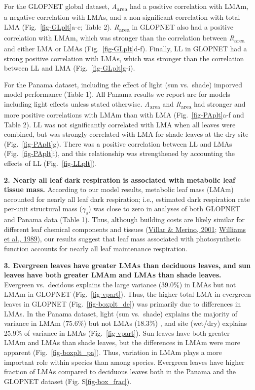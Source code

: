 \documentclass[
  12pt,
  a4paper,
,tablecaptionabove
]{scrartcl}
\begin{document}
For the GLOPNET global dataset, \emph{A}\textsubscript{area} had a
positive correlation with LMAm, a negative correlation with LMAs, and a
non-significant correlation with total LMA (Fig.~\ref{fig-GLplt}a-c;
Table 2). \emph{R}\textsubscript{area} in GLOPNET also had a positive
correlation with LMAm, which was stronger than the correlation between
\emph{R}\textsubscript{area} and either LMA or LMAs
(Fig.~\ref{fig-GLplt}d-f). Finally, LL in GLOPNET had a strong positive
correlation with LMAs, which was stronger than the correlation between
LL and LMA (Fig.~\ref{fig-GLplt}g-i).

For the Panama dataset, including the effect of light (sun vs.~shade)
imporved model performance (Table 1). All Panama results we report are
for models including light effects unless stated otherwise.
\emph{A}\textsubscript{area} and \emph{R}\textsubscript{area} had
stronger and more positive correlations with LMAm than with LMA
(Fig.~\ref{fig-PAplt}a-f and Table 2). LL was not significantly
correlated with LMA when all leaves were combined, but was strongly
correlated with LMA for shade leaves at the dry site
(Fig.~\ref{fig-PAplt}g). There was a positive correlation between LL and
LMAs (Fig.~\ref{fig-PAplt}i), and this relationship was strengthened by
accounting the effects of LL (Fig.~\ref{fig-LLplt}).

\textbf{2. Nearly all leaf dark respiration is associated with metabolic
leaf tissue mass.} According to our model results, metabolic leaf mass
(LMAm) accounted for nearly all leaf dark respiration; i.e., estimated
dark respiration rate per-unit structural mass (\(\gamma_s\)) was close
to zero in analyses of both GLOPNET and Panama data (Table 1). Thus,
although building costs are likely similar for different leaf chemical
components and tissues (\protect\hyperlink{ref-Villar2001}{Villar \&
Merino, 2001}; \protect\hyperlink{ref-Williams1989}{Williams et al.,
1989}), our results suggest that leaf mass associated with
photosynthetic function accounts for nearly all leaf maintenance
respiration.

\textbf{3. Evergreen leaves have greater LMAs than deciduous leaves, and
sun leaves have both greater LMAm and LMAs than shade leaves.} Evergreen
vs.~decidous explains the large variance (39.0\%) in LMAs but not LMAm
in GLOPNET (Fig.~\ref{fig-vpart}). Thus, the higher total LMA in
evergreen leaves in GLOPNET (Fig.~\ref{fig-boxplt_de}) was primarily due
to differences in LMAs. In the Panama dataset, light (sun vs.~shade)
explains the majority of variance in LMAm (75.6\%) but not LMAs (18.3\%)
, and site (wet/dry) explains 25.9\% of variance in LMAs
(Fig.~\ref{fig-vpart}). Sun leaves have both greater LMAm and LMAs than
shade leaves, but the differences in LMAm were more apparent
(Fig.~\ref{fig-boxplt_pa}). Thus, variation in LMAm plays a more
important role within species than among species. Evergreen leaves have
higher fraction of LMAs compared to deciduous leaves both in the Panama
and the GLOPNET dataset (Fig. S\ref{fig-box_frac}).
\end{document}

